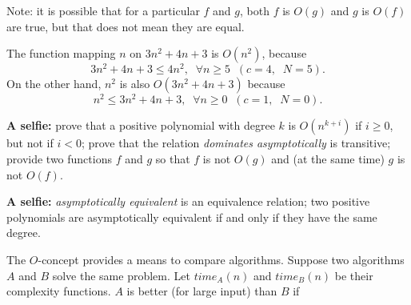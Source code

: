 

Note: it is possible that for a particular $f$ and $g$, both $f$ is
$O(g)$ and $g$ is $O(f)$ are true, but that does not mean they are
equal.

\begin{vb}{
The function mapping $n$ on $3n^2+4n +3$ is $O(n^2)$, because
\[ 3 n^2+4n +3 \leq 4 n^2,\;\; \forall n\geq 5 \;\;(c=4,\;\;N=5).\]
On the other hand, $n^2$ is also $O(3n^2+4n +3)$ because
\[ n^2 \leq 3 n^2+4n+3,\;\; \forall n\geq 0 \;\; (c=1,\;\; N=0). \]
}
\end{vb}

{\bf A selfie:} prove that a positive polynomial with degree $k$ is
$O(n^{k+i})$ if $i \geq 0$, but not if $i < 0$; prove that the
relation {\em dominates asymptotically} is transitive; provide two
functions $f$ and $g$ so that $f$ is not $O(g)$ and (at the same time)
$g$ is not $O(f)$.






{\bf A selfie:} {\em asymptotically equivalent} is an equivalence
relation; two positive polynomials are asymptotically equivalent if
and only if they have the same degree.



The $O$-concept provides a means to compare algorithms. Suppose two
algorithms $A$ and $B$ solve the same problem. Let $time_A(n)$ and
$time_B(n)$ be their complexity functions. $A$ is better (for large
input) than $B$ if 

